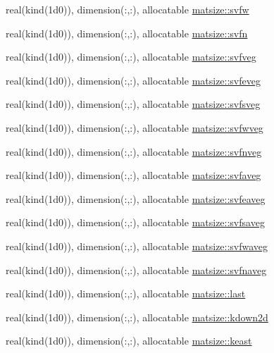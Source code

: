 \begin{DoxyCompactItemize}
\item 
real(kind(1d0)), dimension(\+:,\+:), allocatable \hyperlink{namespacematsize_a2741fe4703b92bb6ec505998bace4876}{matsize\+::svfw}
\item 
real(kind(1d0)), dimension(\+:,\+:), allocatable \hyperlink{namespacematsize_a9be189162686f197e78ed45b00840619}{matsize\+::svfn}
\item 
real(kind(1d0)), dimension(\+:,\+:), allocatable \hyperlink{namespacematsize_a6017bc4aa42fb2d8ee48357bcdfe5cc0}{matsize\+::svfveg}
\item 
real(kind(1d0)), dimension(\+:,\+:), allocatable \hyperlink{namespacematsize_a0f7143b0902f59ee105a54c791da8bae}{matsize\+::svfeveg}
\item 
real(kind(1d0)), dimension(\+:,\+:), allocatable \hyperlink{namespacematsize_abb71084c2bde226d0a5b7227fd1fc5ce}{matsize\+::svfsveg}
\item 
real(kind(1d0)), dimension(\+:,\+:), allocatable \hyperlink{namespacematsize_ae38605d352d15e1892af2d300eed4767}{matsize\+::svfwveg}
\item 
real(kind(1d0)), dimension(\+:,\+:), allocatable \hyperlink{namespacematsize_a7bfc9412546968d3a74b4956b47c8b44}{matsize\+::svfnveg}
\item 
real(kind(1d0)), dimension(\+:,\+:), allocatable \hyperlink{namespacematsize_a8d3d2ca849f0c0098a529191de39e6e2}{matsize\+::svfaveg}
\item 
real(kind(1d0)), dimension(\+:,\+:), allocatable \hyperlink{namespacematsize_abd5b108fa6d58f69e170177ddc18ee1e}{matsize\+::svfeaveg}
\item 
real(kind(1d0)), dimension(\+:,\+:), allocatable \hyperlink{namespacematsize_adecb9ebed13e9583195d044af20c81c6}{matsize\+::svfsaveg}
\item 
real(kind(1d0)), dimension(\+:,\+:), allocatable \hyperlink{namespacematsize_a3633eecab7a13f6237b02654e68b38be}{matsize\+::svfwaveg}
\item 
real(kind(1d0)), dimension(\+:,\+:), allocatable \hyperlink{namespacematsize_a258fb6132f8bd0d53c601353e796c424}{matsize\+::svfnaveg}
\item 
real(kind(1d0)), dimension(\+:,\+:), allocatable \hyperlink{namespacematsize_ab5b5bdd8732edafafedd05776e25e011}{matsize\+::last}
\item 
real(kind(1d0)), dimension(\+:,\+:), allocatable \hyperlink{namespacematsize_a965c1a4db75855ca038aef657921cec9}{matsize\+::kdown2d}
\item 
real(kind(1d0)), dimension(\+:,\+:), allocatable \hyperlink{namespacematsize_a27c05e9fb7688530f45b12163914f2f4}{matsize\+::keast}

\end{DoxyCompactItemize}
